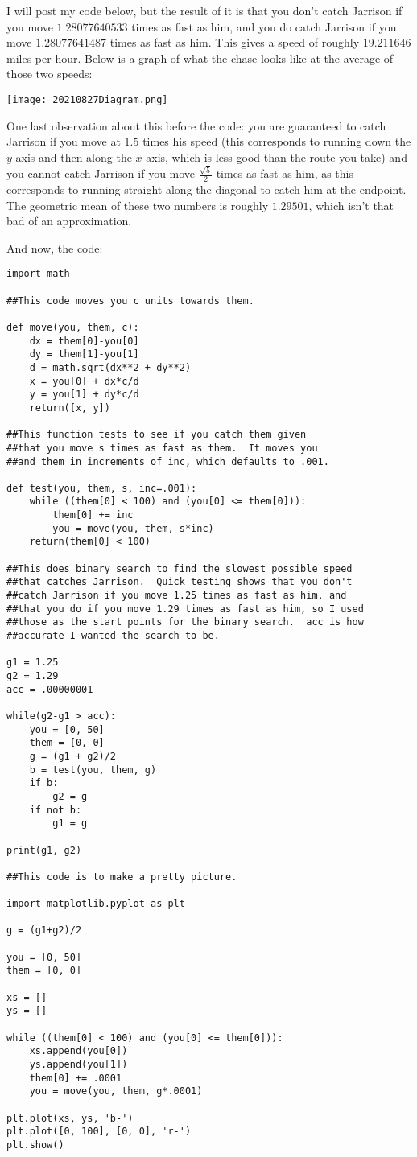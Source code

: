 \documentclass[11pt]{article}
\theoremstyle{definition}
\begin{document}
I will post my code below, but the result of it is that you don't catch Jarrison if you move $1.28077640533$ times as fast as him, and you do catch Jarrison if you move $1.28077641487$ times as fast as him.  This gives a speed of roughly $19.211646$ miles per hour.  Below is a graph of what the chase looks like at the average of those two speeds:

\texttt{[image: 20210827Diagram.png]}

One last observation about this before the code: you are guaranteed to catch Jarrison if you move at $1.5$ times his speed (this corresponds to running down the $y$-axis and then along the $x$-axis, which is less good than the route you take) and you cannot catch Jarrison if you move $\frac{\sqrt{5}}{2}$ times as fast as him, as this corresponds to running straight along the diagonal to catch him at the endpoint.  The geometric mean of these two numbers is roughly $1.29501$, which isn't that bad of an approximation.

And now, the code:
\begin{verbatim}
import math

##This code moves you c units towards them.

def move(you, them, c):
    dx = them[0]-you[0]
    dy = them[1]-you[1]
    d = math.sqrt(dx**2 + dy**2)
    x = you[0] + dx*c/d
    y = you[1] + dy*c/d
    return([x, y])

##This function tests to see if you catch them given
##that you move s times as fast as them.  It moves you
##and them in increments of inc, which defaults to .001.

def test(you, them, s, inc=.001):
    while ((them[0] < 100) and (you[0] <= them[0])):
        them[0] += inc
        you = move(you, them, s*inc)
    return(them[0] < 100)

##This does binary search to find the slowest possible speed
##that catches Jarrison.  Quick testing shows that you don't
##catch Jarrison if you move 1.25 times as fast as him, and
##that you do if you move 1.29 times as fast as him, so I used
##those as the start points for the binary search.  acc is how
##accurate I wanted the search to be.

g1 = 1.25
g2 = 1.29
acc = .00000001

while(g2-g1 > acc):
    you = [0, 50]
    them = [0, 0]
    g = (g1 + g2)/2
    b = test(you, them, g)
    if b:
        g2 = g
    if not b:
        g1 = g

print(g1, g2)

##This code is to make a pretty picture.

import matplotlib.pyplot as plt

g = (g1+g2)/2

you = [0, 50]
them = [0, 0]

xs = []
ys = []

while ((them[0] < 100) and (you[0] <= them[0])):
    xs.append(you[0])
    ys.append(you[1])
    them[0] += .0001
    you = move(you, them, g*.0001)

plt.plot(xs, ys, 'b-')
plt.plot([0, 100], [0, 0], 'r-')
plt.show()
\end{verbatim}
\end{document}
